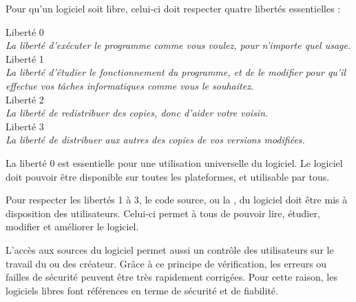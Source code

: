 
Pour qu’un logiciel soit libre, celui-ci doit respecter quatre libertés essentielles :

\begin{center}
\begin{minipage}{0.8\textwidth}
\begin{center}
\textcolor{Cdl}{\large Liberté 0} \\ \textit{La liberté d'exécuter le programme comme vous voulez, pour n'importe quel usage.} \\
\textcolor{Cdl}{\large Liberté 1} \\ \textit{La liberté d'étudier le fonctionnement du programme, et de le modifier pour qu'il effectue vos tâches informatiques comme vous le souhaitez.} \\
\textcolor{Cdl}{\large Liberté 2} \\ \textit{La liberté de redistribuer des copies, donc d'aider votre voisin.} \\
\textcolor{Cdl}{\large Liberté 3} \\ \textit{La liberté de distribuer aux autres des copies de vos versions modifiées.}
\end{center}
\end{minipage}
\end{center}

\begin{multicols}{2}
La \textcolor{Cdl}{liberté 0} est essentielle pour une utilisation universelle du logiciel. Le logiciel doit pouvoir être disponible sur toutes les plateformes, et utilisable par tous.

Pour respecter les \textcolor{Cdl}{libertés 1 à 3}, le code source, ou la , du logiciel doit être mis à disposition des utilisateurs. Celui-ci permet à tous de pouvoir lire, étudier, modifier et améliorer le logiciel. 

L’accès aux \textcolor{Cdl}{sources} du logiciel permet aussi un contrôle des utilisateurs sur le travail du ou des créateur. Grâce à ce principe de vérification, les erreurs ou failles de sécurité peuvent être très rapidement corrigées. Pour cette raison, les logiciels libres font références en terme de sécurité et de fiabilité.
\end{multicols}

